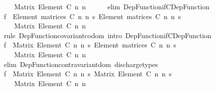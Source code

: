 \begin{isabellebody}
\ \ \ \ Matrix\ {\isacharparenleft}{\kern0pt}Element\ C{\isacharparenright}{\kern0pt}\ n\ n{\isachardoublequoteclose}\isanewline
\ \ \ \ \isamarkupfalse%
\ {\isacharparenleft}{\kern0pt}elim\ Dep{\isacharunderscore}{\kern0pt}Function{\isacharunderscore}{\kern0pt}if{\isacharunderscore}{\kern0pt}CDep{\isacharunderscore}{\kern0pt}Function{\isacharparenright}{\kern0pt}\isanewline
\ \ \isamarkupfalse%
\ \isamarkupfalse%
\ {\isachardoublequoteopen}{\isacharquery}{\kern0pt}f\ {\isacharcolon}{\kern0pt}\ Element\ {\isacharparenleft}{\kern0pt}matrices\ C\ n\ n{\isacharparenright}{\kern0pt}\ {\isasymrightarrow}s\ Element\ {\isacharparenleft}{\kern0pt}matrices\ C\ n\ n{\isacharparenright}{\kern0pt}\ {\isasymrightarrow}s\isanewline
\ \ \ \ Matrix\ {\isacharparenleft}{\kern0pt}Element\ C{\isacharparenright}{\kern0pt}\ n\ n{\isachardoublequoteclose}\isanewline
\ \ \ \ \isamarkupfalse%
\ {\isacharparenleft}{\kern0pt}rule\ Dep{\isacharunderscore}{\kern0pt}Function{\isacharunderscore}{\kern0pt}covariant{\isacharunderscore}{\kern0pt}codom{\isacharcomma}{\kern0pt}\ intro\ Dep{\isacharunderscore}{\kern0pt}Function{\isacharunderscore}{\kern0pt}if{\isacharunderscore}{\kern0pt}CDep{\isacharunderscore}{\kern0pt}Function{\isacharparenright}{\kern0pt}\isanewline
\ \ \isamarkupfalse%
\ \isamarkupfalse%
\ {\isachardoublequoteopen}{\isacharquery}{\kern0pt}f\ {\isacharcolon}{\kern0pt}\ Matrix\ {\isacharparenleft}{\kern0pt}Element\ C{\isacharparenright}{\kern0pt}\ n\ n\ {\isasymrightarrow}s\ Element\ {\isacharparenleft}{\kern0pt}matrices\ C\ n\ n{\isacharparenright}{\kern0pt}\ {\isasymrightarrow}s\isanewline
\ \ \ \ Matrix\ {\isacharparenleft}{\kern0pt}Element\ C{\isacharparenright}{\kern0pt}\ n\ n{\isachardoublequoteclose}\isanewline
\ \ \ \ \isamarkupfalse%
\ {\isacharparenleft}{\kern0pt}elim\ Dep{\isacharunderscore}{\kern0pt}Function{\isacharunderscore}{\kern0pt}contravariant{\isacharunderscore}{\kern0pt}dom{\isacharparenright}{\kern0pt}\ discharge{\isacharunderscore}{\kern0pt}types\isanewline
\ \ \isamarkupfalse%
\ \isamarkupfalse%
\ {\isachardoublequoteopen}{\isacharquery}{\kern0pt}f\ {\isacharcolon}{\kern0pt}\ Matrix\ {\isacharparenleft}{\kern0pt}Element\ C{\isacharparenright}{\kern0pt}\ n\ n\ {\isasymrightarrow}s\ Matrix\ {\isacharparenleft}{\kern0pt}Element\ C{\isacharparenright}{\kern0pt}\ n\ n\ {\isasymrightarrow}s\isanewline
\ \ \ \ Matrix\ {\isacharparenleft}{\kern0pt}Element\ C{\isacharparenright}{\kern0pt}\ n\ n{\isachardoublequoteclose}\isanewline

\end{isabellebody}
